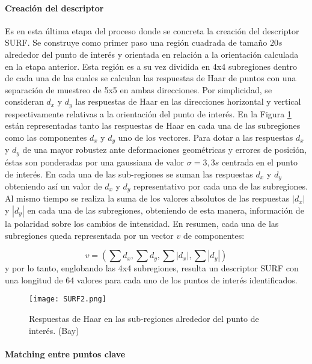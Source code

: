 \paragraph{Creación del descriptor }
Es en esta última etapa del proceso donde se concreta la creación del descriptor SURF. Se construye como primer paso una región cuadrada de tamaño $20s$ alrededor del punto de interés y orientada en relación a la orientación calculada en la etapa anterior. Esta región es a su vez dividida en 4x4 subregiones dentro de cada una de las cuales se calculan las respuestas de Haar de puntos con una separación de muestreo de 5x5 en ambas direcciones. Por simplicidad, se consideran $d_x$ y $d_y$ las respuestas de Haar en las direcciones horizontal y vertical respectivamente relativas a la orientación del punto de interés. En la Figura \ref{fig:surf2} están representadas tanto las respuestas de Haar en cada una de las subregiones como las componentes $d_x$ y $d_y$ uno de los vectores. Para dotar a las respuestas $d_x$ y $d_y$ de una mayor robustez ante deformaciones geométricas y errores de posición, éstas son ponderadas por una gaussiana de valor $\sigma = 3,3s$ centrada en el punto de interés. En cada una de las sub-regiones se suman las respuestas $d_x$ y $d_y$ obteniendo así un valor de $d_x$ y $d_y$ representativo por cada una de las subregiones. 
Al mismo tiempo se realiza la suma de los valores absolutos de las respuestas $|d_x|$ y $|d_y|$ en cada una de las subregiones, obteniendo de esta manera, información de la polaridad sobre los cambios de intensidad. En resumen, cada una de las subregiones queda representada por un vector $v$ de componentes:

\begin{equation}
  v = (\sum d_x,\sum d_y, \sum |d_x|, \sum |d_y|)
\end{equation}
y por lo tanto, englobando las 4x4 subregiones, resulta un descriptor SURF con una longitud de 64 valores para cada uno de los puntos de interés identificados.

\begin{figure}
  \centering
  \texttt{[image: SURF2.png]}
  \caption{Respuestas de Haar en las sub-regiones alrededor del punto de interés. (Bay)}
  \label{fig:surf2}
\end{figure}

\paragraph{Matching entre puntos clave}

